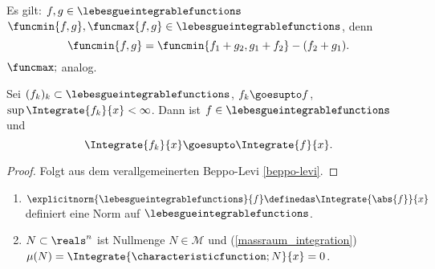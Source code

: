 \begin{bemerkung*}
  Es gilt: \( f,g\in \lebesgueintegrablefunctions \) \timplies \( \funcmin{f,g},\funcmax{f,g}\in \lebesgueintegrablefunctions \), denn
  \begin{equation*}
    \funcmin{f,g}=\funcmin{f_1+g_2,g_1+f_2}-(f_2+g_1).
  \end{equation*}
  \( \funcmax; \) analog.
\end{bemerkung*}
\begin{satz}\label{beppo-levi-einfach}
  Sei \( (f_k)_k\subset \lebesgueintegrablefunctions \), \( f_k\goesupto f \), \( \sup \Integrate{f_k}{x}<\infty \). Dann ist \( f\in \lebesgueintegrablefunctions \) und 
  \begin{equation*}
    \Integrate{f_k}{x}\goesupto \Integrate{f}{x}.
  \end{equation*}
\end{satz}
\begin{proof}
  Folgt aus dem verallgemeinerten Beppo-Levi \ref{beppo-levi}.
\end{proof}
\begin{folgerung}
  \begin{enumerate}
    \item\label{lebesgue_integrable_funktionen_norm} \( \explicitnorm{\lebesgueintegrablefunctions}{f}\definedas \Integrate{\abs{f}}{x} \) definiert eine Norm auf \( \lebesgueintegrablefunctions \).
    \item\label{nullmengen_funzen_mit_sigma_algebra} \( N\subset \reals^n \) ist Nullmenge \tiff \( N\in \mathcal{M} \) und  (\s \ref{massraum_integration}) \( \mu(N)=\Integrate{\characteristicfunction;{N}}{x}=0 \).
  \end{enumerate}
\end{folgerung}
